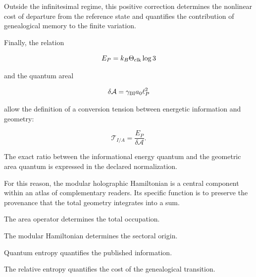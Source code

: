 Outside the infinitesimal regime, this positive correction determines the nonlinear cost of departure from the reference state and quantifies the contribution of genealogical memory to the finite variation.\par

Finally, the relation\par

\[
E_P=k_B\Theta_{\rm clk}\log3
\]

and the quantum areal\par

\[
\delta\mathcal A
=
\gamma_{\rm BI}a_0\ell_P^2
\]

allow the definition of a conversion tension between energetic information and geometry:\par

\[
\mathcal T_{I/A}
=
\frac{E_P}{\delta\mathcal A}.
\]

The exact ratio between the informational energy quantum and the geometric area quantum is expressed in the declared normalization.\par

For this reason, the modular holographic Hamiltonian is a central component within an atlas of complementary readers. Its specific function is to preserve the provenance that the total geometry integrates into a sum.\par

The area operator determines the total occupation.\par
The modular Hamiltonian determines the sectoral origin.\par
Quantum entropy quantifies the published information.\par
The relative entropy quantifies the cost of the genealogical transition.\par
